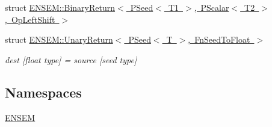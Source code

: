 \begin{DoxyCompactItemize}
\item 
struct \mbox{\hyperlink{structENSEM_1_1BinaryReturn_3_01PSeed_3_01T1_01_4_00_01PScalar_3_01T2_01_4_00_01OpLeftShift_01_4}{E\+N\+S\+E\+M\+::\+Binary\+Return$<$ P\+Seed$<$ T1 $>$, P\+Scalar$<$ T2 $>$, Op\+Left\+Shift $>$}}
\item 
struct \mbox{\hyperlink{structENSEM_1_1UnaryReturn_3_01PSeed_3_01T_01_4_00_01FnSeedToFloat_01_4}{E\+N\+S\+E\+M\+::\+Unary\+Return$<$ P\+Seed$<$ T $>$, Fn\+Seed\+To\+Float $>$}}
\begin{DoxyCompactList}\small\item\em dest \mbox{[}float type\mbox{]} = source \mbox{[}seed type\mbox{]} \end{DoxyCompactList}\end{DoxyCompactItemize}
\subsection*{Namespaces}
\begin{DoxyCompactItemize}
\item 
 \mbox{\hyperlink{namespaceENSEM}{E\+N\+S\+EM}}
\end{DoxyCompactItemize}

